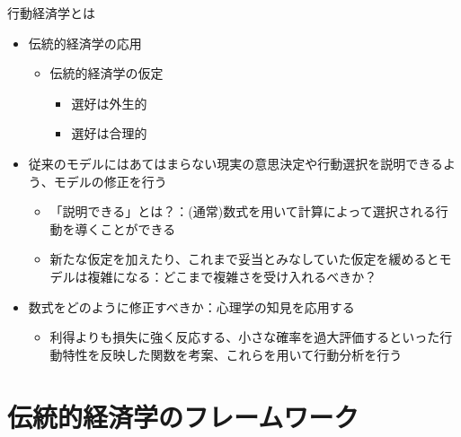 \documentclass[dvipdfmx,11pt]{beamer}
\begin{document}
\begin{frame}{行動経済学とは}
  \begin{itemize}
    \item 伝統的経済学の応用
    \begin{itemize}
      \item 伝統的経済学の仮定
      \begin{itemize}
        \item 選好は外生的
        \item 選好は合理的
      \end{itemize}
    \end{itemize}
    \item 従来のモデルにはあてはまらない現実の意思決定や行動選択を説明できるよう、モデルの修正を行う
    \begin{itemize}
      \item 「説明できる」とは？：(通常)数式を用いて計算によって選択される行動を導くことができる
      \item 新たな仮定を加えたり、これまで妥当とみなしていた仮定を緩めるとモデルは複雑になる：どこまで複雑さを受け入れるべきか？
    \end{itemize}
    \item 数式をどのように修正すべきか：心理学の知見を応用する
    \begin{itemize}
      \item 利得よりも損失に強く反応する、小さな確率を過大評価するといった行動特性を反映した関数を考案、これらを用いて行動分析を行う
    \end{itemize}
  \end{itemize}
\end{frame}

\section{伝統的経済学のフレームワーク}
\frame{\sectionpage}
\end{document}
